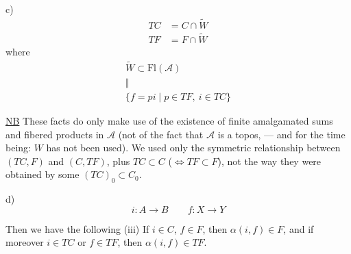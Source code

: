 c) 
\[
\begin{aligned}
TC&=C\cap\widetilde W\\
TF&=F\cap\widetilde W
\end{aligned}
\]
where
\[
\begin{gathered}
\widetilde W\subset\mathrm{Fl}(\mathcal A)\\
\Vert\\
\{f=pi\mid p\in TF,\ i\in TC\}
\end{gathered}
\]

\uline{NB} These facts do only make use of the existence of finite amalgamated sums and fibered products in $\mathcal A$ (not of the fact that $\mathcal A$ is a topos, --- and for the time being: $W$ has not been used).
We used only the symmetric relationship between  $(TC,F)$ and $(C,TF)$,  plus $TC\subset C$ ($\Leftrightarrow TF\subset F$), not the way they were obtained by some  $(TC)_0\subset C_0$.

d)  
\[
i\colon A\to B\qquad f\colon X\to Y
\]
\qquad{}


Then we have the following 
(iii) If $i\in C$, $f\in F$, then $\alpha(i,f)\in F$, and if moreover $i\in TC$ or $f\in TF$, then $\alpha(i,f)\in TF$.
